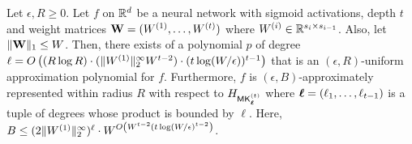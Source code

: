\begin{theorem}
\label{thm:approx_sigmoid_nets}
    Let $\epsilon,R\geq 0$. Let $f$ on $\mathbb{R}^{d}$ be a neural network with sigmoid activations, depth $t$ and weight matrices $\mathbf{W}=(W^{(1)},\ldots,W^{(t)})$ where $W^{(i)}\in \mathbb{R}^{s_i\times s_{i-1}}$. Also, let $\|\mathbf{W}\|_1\leq W$. Then, there exists of a polynomial $p$ of degree $\ell=O\left((R\log R)\cdot (\|W^{(1)}\|_{2}^{\infty}W^{t-2})\cdot (t\log(W/\epsilon))^{t-1}\right)$ that is an $(\epsilon,R)$-uniform approximation polynomial for $f$. Furthermore,  $f$ is $(\epsilon, B)$-approximately represented within radius $R$ with respect to $H_{\mathsf{MK}_{\boldsymbol{\ell}}^{(t)}}$ where $\boldsymbol{\ell}=(\ell_1,\ldots,\ell_{t-1})$ is a tuple of degrees whose product is bounded by $\ell$. Here, $B\leq (2\|W^{(1)}\|_{2}^{\infty})^{\ell}\cdot W^{O\left(W^{t-2}(t\log(W/\epsilon)^{t-2}\right)}$.
\end{theorem}
